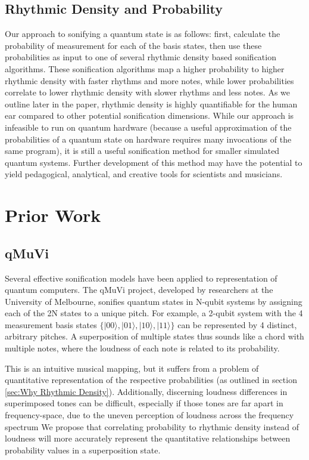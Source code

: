 \documentclass[10pt,twocolumn]{article}
\begin{document}
\subsection{Rhythmic Density and Probability}

Our approach to sonifying a quantum state is as follows: first, calculate the probability of measurement for each of the basis states, then use these probabilities as input to one of several rhythmic density based sonification algorithms. These sonification algorithms map a higher probability to higher rhythmic density with faster rhythms and more notes, while lower probabilities correlate to lower rhythmic density with slower rhythms and less notes. As we outline later in the paper, rhythmic density is highly quantifiable for the human ear compared to other potential sonification dimensions. While our approach is infeasible to run on quantum hardware (because a useful approximation of the probabilities of a quantum state on hardware requires many invocations of the same program), it is still a useful sonification method for smaller simulated quantum systems. Further development of this method may have the potential to yield pedagogical, analytical, and creative tools for scientists and musicians.

\section{Prior Work}

\subsection{qMuVi}

Several effective sonification models have been applied to representation of quantum computers. The qMuVi\cite{qmuvi} project, developed by researchers at the University of Melbourne, sonifies quantum states in N-qubit systems by assigning each of the 2N states to a unique pitch. For example, a 2-qubit system with the 4 measurement basis states $\{|00\rangle, |01\rangle, |10\rangle, |11\rangle\}$ can be represented by 4 distinct, arbitrary pitches. A superposition of multiple states thus sounds like a chord with multiple notes, where the loudness of each note is related to its probability.

This is an intuitive musical mapping, but it suffers from a problem of quantitative representation of the respective probabilities (as outlined in section \ref{sec:Why Rhythmic Density}). Additionally, discerning loudness differences in superimposed tones can be difficult, especially if those tones are far apart in frequency-space, due to the uneven perception of loudness across the frequency spectrum\cite{smyth2019} We propose that correlating probability to rhythmic density instead of loudness will more accurately represent the quantitative relationships between probability values in a superposition state.
\end{document}
